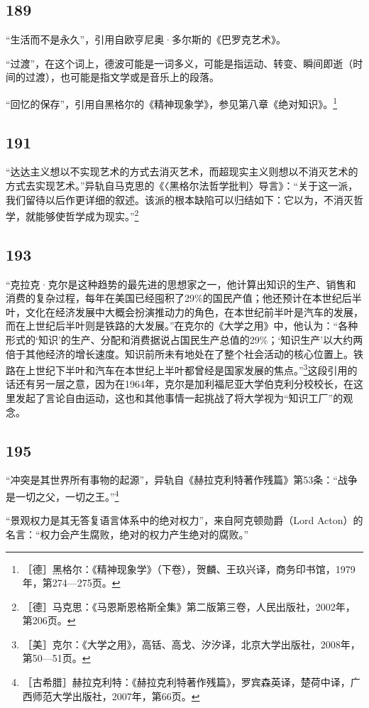 \documentclass[fontset=fandol, a4paper, 12pt, openright]{ctexbook}
\begin{document}
\subsection*{189}
“生活而不是永久”，引用自欧亨尼奥·多尔斯的《巴罗克艺术》。

“过渡”，在这个词上，德波可能是一词多义，可能是指运动、转变、瞬间即逝（时间的过渡），也可能是指文学或是音乐上的段落。

“回忆的保存”，引用自黑格尔的《精神现象学》，参见第八章《绝对知识》。\footnote{［德］黑格尔：《精神现象学》（下卷），贺麟、王玖兴译，商务印书馆，1979年，第274—275页。}

\subsection*{191}
“达达主义想以不实现艺术的方式去消灭艺术，而超现实主义则想以不消灭艺术的方式去实现艺术。”异轨自马克思的《〈黑格尔法哲学批判〉导言》：“关于这一派，我们留待以后作更详细的叙述。该派的根本缺陷可以归结如下：它以为，不消灭哲学，就能够使哲学成为现实。”\footnote{［德］马克思：《马恩斯恩格斯全集》第二版第三卷，人民出版社，2002年，第206页。}

\subsection*{193}
“克拉克·克尔是这种趋势的最先进的思想家之一，他计算出知识的生产、销售和消费的复杂过程，每年在美国已经囤积了29\%的国民产值；他还预计在本世纪后半叶，文化在经济发展中大概会扮演推动力的角色，在本世纪前半叶是汽车的发展，而在上世纪后半叶则是铁路的大发展。”在克尔的《大学之用》中，他认为：“各种形式的‘知识’的生产、分配和消费据说占国民生产总值的29\%；‘知识生产’以大约两倍于其他经济的增长速度。知识前所未有地处在了整个社会活动的核心位置上。铁路在上世纪下半叶和汽车在本世纪上半叶都曾经是国家发展的焦点。”\footnote{［美］克尔：《大学之用》，高铦、高戈、汐汐译，北京大学出版社，2008年，第50—51页。}这段引用的话还有另一层之意，因为在1964年，克尔是加利福尼亚大学伯克利分校校长，在这里发起了言论自由运动，这也和其他事情一起挑战了将大学视为“知识工厂”的观念。

\subsection*{195}
“冲突是其世界所有事物的起源”，异轨自《赫拉克利特著作残篇》第53条：“战争是一切之父，一切之王。”\footnote{［古希腊］赫拉克利特：《赫拉克利特著作残篇》，罗宾森英译，楚荷中译，广西师范大学出版社，2007年，第66页。}

“景观权力是其无答复语言体系中的绝对权力”，来自阿克顿勋爵（Lord Acton）的名言：“权力会产生腐败，绝对的权力产生绝对的腐败。”
\end{document}
